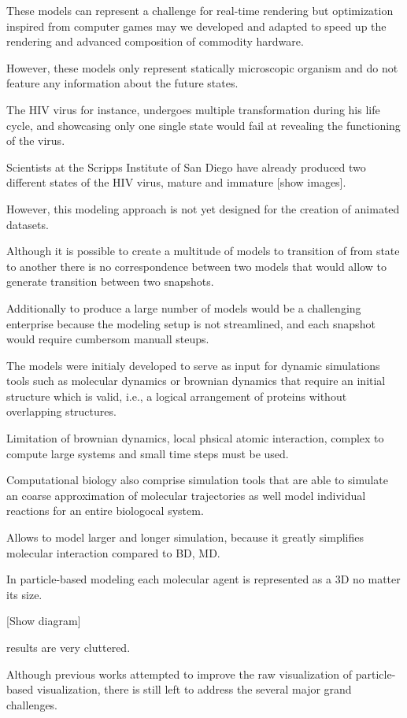 These models can represent a challenge for real-time rendering but optimization inspired from computer games may we developed and adapted to speed up the rendering and advanced composition of commodity hardware.

However, these models only represent statically microscopic organism and do not feature any information about the future states.

The HIV virus for instance, undergoes multiple transformation during his life cycle, and showcasing only one single state would fail at revealing the functioning of the virus.

Scientists at the Scripps Institute of San Diego have already produced two different states of the HIV virus, mature and immature [show images].

However, this modeling approach is not yet designed for the creation of animated datasets.

Although it is possible to create a multitude of models to transition of from state to another there is no correspondence between two models that would allow to generate transition between two snapshots.

Additionally to produce a large number of models would be a challenging enterprise because the modeling setup is not streamlined, and each snapshot would require cumbersom manuall steups.


The models were initialy developed to serve as input for dynamic simulations tools such as molecular dynamics or brownian dynamics that require an initial structure which is valid, i.e., a logical arrangement of proteins without overlapping structures.

Limitation of brownian dynamics, local phsical atomic interaction, complex to compute large systems and small time steps must be used.


Computational biology also comprise simulation tools that are able to simulate an coarse approximation of molecular trajectories as well model individual reactions for an entire biologocal system.

Allows to model larger and longer simulation, because it greatly simplifies molecular interaction compared to BD, MD.

In particle-based modeling each molecular agent is represented as a 3D no matter its size.

[Show diagram]

results are very cluttered.

Although previous works attempted to improve the raw visualization of particle-based visualization, there is still left to address the several major grand challenges.

